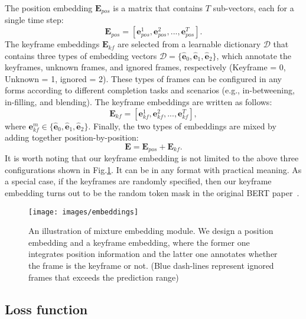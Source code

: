 \documentclass[10pt,twocolumn,letterpaper]{article}
\begin{document}
The position embedding $\bm{E}_{pos}$ is a matrix that contains $T$ sub-vectors, each for a single time step: 
\begin{equation}
    \bm{E}_{pos} = [\bm{e}_{pos}^1,\bm{e}_{pos}^2,...,\bm{e}_{pos}^T].
\end{equation}
The keyframe embeddings $\bm{E}_{kf}$ are selected from a learnable  dictionary $\mathcal{D}$ that contains three types of embedding vectors $\mathcal{D} = \{ \hat{\bm{e}}_0, \hat{\bm{e}}_1, \hat{\bm{e}}_2 \}$, which annotate the keyframes, unknown frames, and ignored frames, respectively (Keyframe = 0, Unknown = 1, ignored = 2). These types of frames can be configured in any forms according to different completion tasks and scenarios (e.g., in-betweening, in-filling, and blending). The keyframe embeddings are written as follows:
\begin{equation}
    \bm{E}_{kf} = [\bm{e}_{kf}^1,\bm{e}_{kf}^2,...,\bm{e}_{kf}^T],
\end{equation}
where $\bm{e}_{kf}^{m} \in \{ \hat{\bm{e}}_0, \hat{\bm{e}}_1, \hat{\bm{e}}_2 \}$. Finally, the two types of embeddings are mixed by adding together position-by-position:
\begin{equation}
    \bm{E} = \bm{E}_{pos} + \bm{E}_{kf}.
\end{equation}
It is worth noting that our keyframe embedding is not limited to the above three configurations shown in Fig.\ref{fig:embeddings}. It can be in any format with practical meaning. As a special case, if the keyframes are randomly specified, then our keyframe embedding turns out to be the random token mask in the original BERT paper~\cite{devlin2018bert}.


\begin{figure}[t]
  \centering
  \texttt{[image: images/embeddings]}
  \caption{An illustration of mixture embedding module. We design a position embedding and a keyframe embedding, where the former one integrates position information and the latter one annotates whether the frame is the keyframe or not. (Blue dash-lines represent ignored frames that exceeds the prediction range)}
  \label{fig:embeddings}
\end{figure}


\subsection{Loss function}
\end{document}
